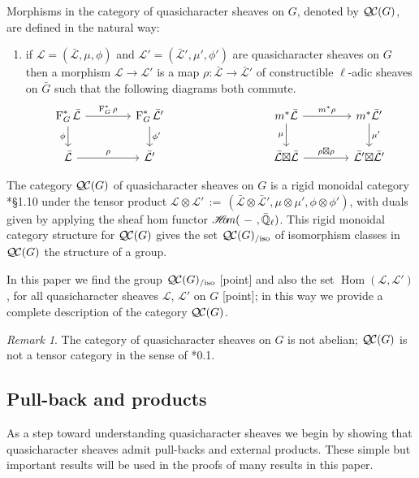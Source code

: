 \documentclass{amsart}
\makeatletter
\theoremstyle{plain}
\theoremstyle{definition}
\theoremstyle{remark}
\newtheorem{remark}[theorem]{Remark}
\newcommand{\EE}{\mathbb{\bar Q}_\ell}
\newcommand{\Fq}{k}
\newcommand{\Frob}[1]{\operatorname{F}_{#1}}
\DeclareMathOperator{\Hom}{Hom}
\newcommand{\sheafHom}{{\mathscr{H}\hskip-4pt{\it o}\hskip-2pt{\it m}}}
\newcommand{\ceq}{{\, :=\, }}
\newcommand{\qcs}[1]{{\mathcal{#1}}}
\newcommand{\gqcs}[1]{{\mathcal{\bar #1}}}
\newcommand{\QC}{{\mathcal{Q\hskip-0.8pt C}}}
\newcommand{\QCiso}[1]{\QC(#1)_{/\text{iso}}}
\newcommand{\labitem}[2]{
\def\@itemlabel{\textbf{#1}}
\item
\def\@currentlabel{#1}\label{#2}}
\newcommand{\bG}{\bar{G}}
\newcommand{\tight}[3]{\hspace{-#1pt}{#2}\hspace{-#3pt}}
\newcommand{\LxL}{\text{$\gqcs{L} \tight{0}{\boxtimes}{0} \gqcs{L}$}}
\makeatother
\begin{document}
Morphisms in the category of quasicharacter sheaves on $G$, denoted by $\QC(G)$, are defined in the natural way:
\begin{enumerate}
\labitem{(QC.4)}{QC.4} if $\qcs{L} = (\gqcs{L},\mu,\phi)$ and
  $\qcs{L'} = (\gqcs{L'},\mu',\phi')$ are quasicharacter sheaves on $G$ then
  a morphism $\qcs{L} \to \qcs{L}'$ is a map $\rho : \gqcs{L} \to \gqcs{L'}$
  of constructible $\ell$-adic sheaves on $\bG$ such that the following diagrams both commute.
  \[
  \begin{tikzcd}[column sep=40]
  \Frob{G}^* \gqcs{L} \rar{\Frob{G}^* \rho} \arrow[swap]{d}{\phi} & \Frob{G}^* \gqcs{L'} \dar{\phi'}
  & & \arrow[swap]{d}{\mu} m^* \gqcs{L} \rar{m^* \rho} & m^* \gqcs{L'} \dar{\mu'} \\
  \gqcs{L} \rar{\rho} & \gqcs{L'}
  & {} & \LxL \rar{\tight{1}{\rho\boxtimes \rho}{1}} & \gqcs{L'} \tight{0}{\boxtimes}{0} \gqcs{L'}
  \end{tikzcd}
  \]
\end{enumerate}

The category $\QC(G)$ of quasicharacter sheaves on $G$ is a rigid monoidal category
\cite{etingof:09a}*{\S1.10} under the tensor product
$\qcs{L} \otimes \qcs{L'} \ceq (\gqcs{L}\otimes\gqcs{L'}, \mu\otimes\mu', \phi\otimes \phi')$,
with duals given by applying the sheaf hom functor
$\sheafHom(\ - \ ,\EE)$.
This rigid monoidal category structure for $\QC(G)$ gives the set $\QCiso{G}$
of isomorphism classes in $\QC(G)$ the structure of a group.

In this paper we find the group $\QCiso{G}$ [point]
and also the set $\Hom(\qcs{L},\qcs{L}')$, for all quasicharacter sheaves $\qcs{L}$, $\qcs{L}'$ on $G$ [point]; in this way we provide a complete description of the category $\QC(G)$.

\begin{remark}
The category of quasicharacter sheaves on $G$ is not abelian; $\QC(G)$
is not a tensor category in the sense of \cite{deligne:02a}*{0.1}.
\end{remark}

\subsection{Pull-back and products}\label{sec:pullback}

As a step toward understanding quasicharacter sheaves we begin by showing that quasicharacter sheaves admit pull-backs and external products.
These simple but important results will be used in the proofs of many results in this paper.
\end{document}
